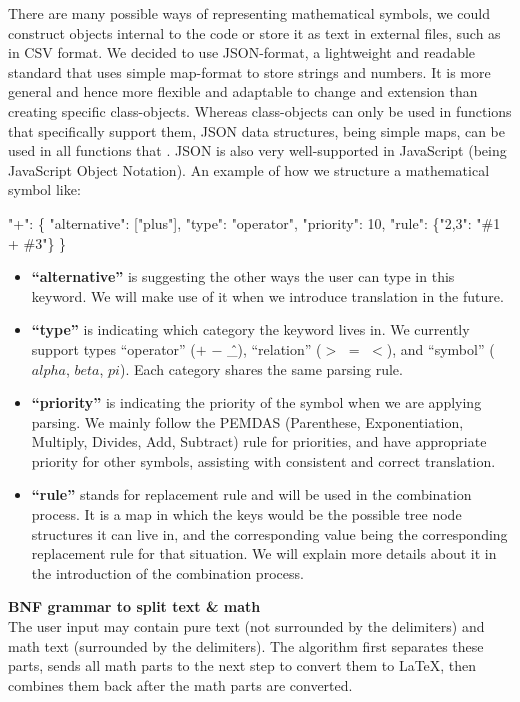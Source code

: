 \documentclass[11pt]{article}
\theoremstyle{definition}
\begin{document}
\begin{enumerate}
There are many possible ways of representing mathematical symbols, we could construct objects internal to the code or store it as text in external files, such as in CSV format. We decided to use JSON-format, a lightweight and readable standard that uses simple map-format to store strings and numbers. It is more general and hence more flexible and adaptable to change and extension than creating specific class-objects. Whereas class-objects can only be used in functions that specifically support them, JSON data structures, being simple maps, can be used in all functions that . JSON is also very well-supported in JavaScript (being JavaScript Object Notation). An example of how we structure a mathematical symbol like: 
\begin{codebox}
\li "+": \{
\li \Do "alternative": ["plus"],
\li     "type": "operator",
\li     "priority": 10,
\li     "rule": \{"2,3": "\#1 + \#3"\}
    \End 
\li \}
\end{codebox}
\begin{itemize}
\item \textbf{“alternative”} is suggesting the other ways the user can type in this keyword. We will make use of it when we introduce translation in the future.
\item \textbf{“type”} is indicating which category the keyword lives in. We currently support types “operator” ($+$ $-$ \^ \_), “relation” ($>$ $=$ $<$), and “symbol” ($alpha$, $beta$, $pi$). Each category shares the same parsing rule.
\item \textbf{“priority”} is indicating the priority of the symbol when we are applying parsing. We mainly follow the PEMDAS (Parenthese, Exponentiation, Multiply, Divides, Add, Subtract) rule for priorities, and have appropriate priority for other symbols, assisting with consistent and correct translation.
\item \textbf{“rule”} stands for replacement rule and will be used in the combination process. It is a map in which the keys would be the possible tree node structures it can live in, and the corresponding value being the corresponding replacement rule for that situation. We will explain more details about it in the introduction of the combination process.
\end{itemize}
\textbf{BNF grammar to split text \& math} \\
The user input may contain pure text (not surrounded by the delimiters) and math text (surrounded by the delimiters). The algorithm first separates these parts, sends all math parts to the next step to convert them to LaTeX, then combines them back after the math parts are converted. \\


\end{enumerate}
\end{document}
